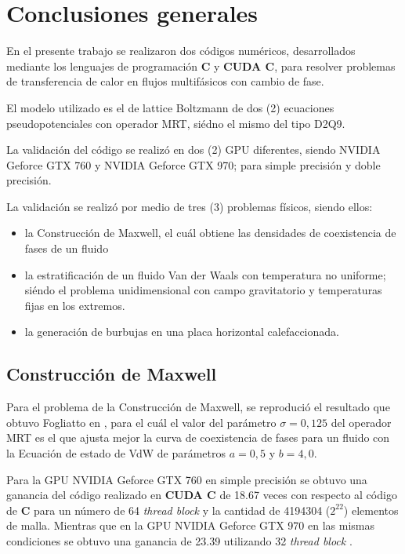 \chapter{Conclusiones generales}
\graphicspath{{figs/cap4/}}
\label{cap5}

En el presente trabajo se realizaron dos códigos numéricos, desarrollados mediante los lenguajes de programación \textbf{C} y \textbf{CUDA C}, para resolver problemas de transferencia de calor en flujos multifásicos con cambio de fase.

El modelo utilizado es el de lattice Boltzmann de dos (2) ecuaciones pseudopotenciales con operador MRT, siédno el mismo del tipo D2Q9.

La validación del código se realizó en dos (2) GPU diferentes, siendo NVIDIA Geforce GTX 760 y  NVIDIA Geforce GTX 970; para simple precisión y doble precisión.

La validación se realizó por medio de tres (3) problemas físicos, siendo ellos:

\begin{itemize}
    
    \item la Construcción de Maxwell, el cuál obtiene las densidades de coexistencia de fases de un fluido 

    \item la estratificación de un fluido Van der Waals con temperatura no uniforme; siéndo el problema unidimensional con campo gravitatorio y temperaturas fijas en los extremos.

    \item la generación de burbujas en una placa horizontal calefaccionada.

\end{itemize}

\section{Construcción de Maxwell}

Para el problema de la Construcción de Maxwell, se reprodució el resultado que obtuvo Fogliatto en \cite{fogliatto2019simulation}, para el cuál el valor del parámetro $\sigma = 0,125$ del operador MRT es el que ajusta mejor la curva de coexistencia de fases para un fluido con la Ecuación de estado de VdW de parámetros $ a = 0,5 $ y $ b = 4,0 $. 

Para la GPU NVIDIA Geforce GTX 760 en simple precisión se obtuvo una ganancia del código realizado en \textbf{CUDA C} de 18.67 veces con respecto al código de \textbf{C} para un número de 64 \textit{thread block} y la cantidad de 4194304 ($2^{22}$) elementos de malla. Mientras que en la  GPU NVIDIA Geforce GTX 970 en las mismas condiciones se obtuvo una ganancia de 23.39 utilizando 32 \textit{thread block} .

